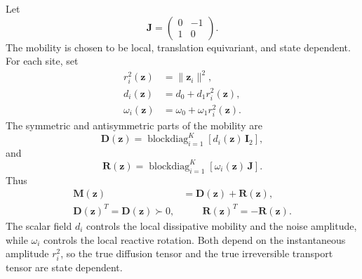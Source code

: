 \documentclass[11pt,twoside,fleqn]{article}
\begin{document}
Let
\begin{equation}
    \bm{J}
    =
    \begin{pmatrix}
        0 & -1\\
        1 & 0
    \end{pmatrix}.
    \label{eq:cgl_chain_J_matrix}
\end{equation}
The mobility is chosen to be local, translation equivariant, and state dependent. For each site, set
\begin{align}
    r_i^2(\bm{z})
    &=
    \|\bm{z}_i\|^2,
    \\
    d_i(\bm{z})
    &=
    d_0+d_1 r_i^2(\bm{z}),
    \\
    \omega_i(\bm{z})
    &=
    \omega_0+\omega_1 r_i^2(\bm{z}).
    \label{eq:cgl_chain_local_mobility_coefficients}
\end{align}
The symmetric and antisymmetric parts of the mobility are
\begin{equation}
    \bm{D}(\bm{z})
    =
    \operatorname{blockdiag}_{i=1}^{K}
    \left[
        d_i(\bm{z})\,\bm{I}_2
    \right],
    \label{eq:cgl_chain_D_definition}
\end{equation}
and
\begin{equation}
    \bm{R}(\bm{z})
    =
    \operatorname{blockdiag}_{i=1}^{K}
    \left[
        \omega_i(\bm{z})\,\bm{J}
    \right].
    \label{eq:cgl_chain_R_definition}
\end{equation}
Thus
\begin{equation}
\begin{aligned}
    \bm{M}(\bm{z})
    &=
    \bm{D}(\bm{z})
    +
    \bm{R}(\bm{z}),
    \\
    \bm{D}(\bm{z})^T=\bm{D}(\bm{z})\succ0,
    &\qquad
    \bm{R}(\bm{z})^T=-\bm{R}(\bm{z}).
\end{aligned}
    \label{eq:cgl_chain_M_definition}
\end{equation}
The scalar field \(d_i\) controls the local dissipative mobility and the noise amplitude, while \(\omega_i\) controls the local reactive rotation. Both depend on the instantaneous amplitude \(r_i^2\), so the true diffusion tensor and the true irreversible transport tensor are state dependent.
\end{document}
